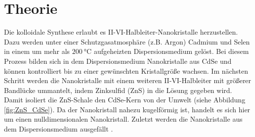 \section{Theorie}
\label{sec:Theorie}


Die kolloidale Synthese erlaubt es II-VI-Halbleiter-Nanokristalle herzustellen.
Dazu werden unter einer Schutzgasatmosphäre (z.B. Argon) Cadmium und Selen in
einem um mehr als $\SI{200}{\degreeCelsius}$ aufgeheizten Dispersionsmedium
gelöst. Bei diesem Prozess bilden sich in dem Dispersionsmedium Nanokristalle
aus CdSe und können kontrolliert bis zu einer gewünschten Kristallgröße wachsen.
Im nächsten Schritt werden die Nanokristalle mit einem weiteren II-VI-Halbleiter
mit größerer Bandlücke ummantelt, indem Zinksulfid (ZnS) in die Lösung gegeben wird.
Damit isoliert die ZnS-Schale den CdSe-Kern von der Umwelt (siehe Abbildung
\ref{fig:ZnS_CdSe}). Da der Nanokristall nahezu kugelförmig ist, handelt es sich
hier um einen nulldimensionalen Nanokristall. Zuletzt werden die Nanokristalle
aus dem Dispersionsmedium ausgefällt \cite{komp}.\\

